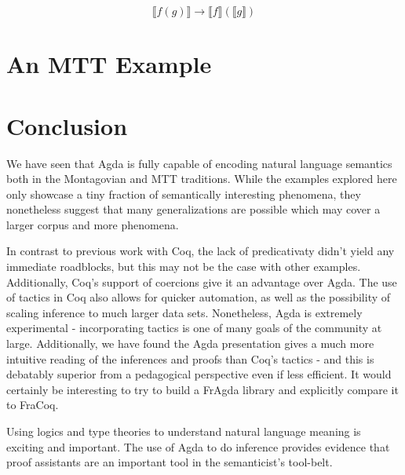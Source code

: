 \documentclass[a4paper, 11pt]{article}
\begin{document}
$$\llbracket f(g) \rrbracket \rightarrow \llbracket f \rrbracket (\llbracket g \rrbracket)$$



\section{An MTT Example}



\section{Conclusion}

We have seen that Agda is fully capable of encoding natural language semantics
both in the Montagovian and MTT traditions. While the examples explored here
only showcase a tiny fraction of semantically interesting phenomena, they
nonetheless suggest that many generalizations are possible which may cover a
larger corpus and more phenomena.

In contrast to previous work with Coq, the lack of predicativaty didn't yield
any immediate roadblocks, but this may not be the case with other examples.
Additionally, Coq's support of coercions give it an advantage over Agda. The use
of tactics in Coq also allows for quicker automation, as well as the possibility
of scaling inference to much larger data sets. Nonetheless, Agda is extremely
experimental - incorporating tactics is one of many goals of the community at
large. Additionally, we have found the Agda presentation gives a much more
intuitive reading of the inferences and proofs than Coq's tactics - and this is
debatably superior from a pedagogical perspective even if less efficient. It would
certainly be interesting to try to build a FrAgda library and explicitly compare
it to FraCoq.

Using logics and type theories to understand natural language meaning is
exciting and important. The use of Agda to do inference provides evidence that
proof assistants are an important tool in the semanticist's tool-belt.


\printbibliography
\end{document}
